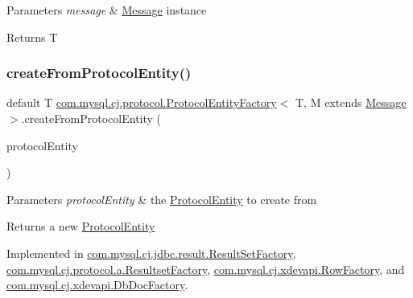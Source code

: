 \begin{DoxyParams}{Parameters}
{\em message} & \mbox{\hyperlink{interfacecom_1_1mysql_1_1cj_1_1protocol_1_1_message}{Message}} instance \\
\hline
\end{DoxyParams}
\begin{DoxyReturn}{Returns}
T 
\end{DoxyReturn}
\mbox{\label{interfacecom_1_1mysql_1_1cj_1_1protocol_1_1_protocol_entity_factory_a282b14fecc86c7202cd9361333235ef8}} 
\subsubsection{\texorpdfstring{create\+From\+Protocol\+Entity()}{createFromProtocolEntity()}}
{\footnotesize\ttfamily default T \mbox{\hyperlink{interfacecom_1_1mysql_1_1cj_1_1protocol_1_1_protocol_entity_factory}{com.\+mysql.\+cj.\+protocol.\+Protocol\+Entity\+Factory}}$<$ T, M extends \mbox{\hyperlink{interfacecom_1_1mysql_1_1cj_1_1protocol_1_1_message}{Message}} $>$.create\+From\+Protocol\+Entity (\begin{DoxyParamCaption}\item[{\mbox{\hyperlink{interfacecom_1_1mysql_1_1cj_1_1protocol_1_1_protocol_entity}{Protocol\+Entity}}}]{protocol\+Entity }\end{DoxyParamCaption})}


\begin{DoxyParams}{Parameters}
{\em protocol\+Entity} & the \mbox{\hyperlink{interfacecom_1_1mysql_1_1cj_1_1protocol_1_1_protocol_entity}{Protocol\+Entity}} to create from \\
\hline
\end{DoxyParams}
\begin{DoxyReturn}{Returns}
a new \mbox{\hyperlink{interfacecom_1_1mysql_1_1cj_1_1protocol_1_1_protocol_entity}{Protocol\+Entity}} 
\end{DoxyReturn}


Implemented in \mbox{\hyperlink{classcom_1_1mysql_1_1cj_1_1jdbc_1_1result_1_1_result_set_factory_a5638ebeb2a785cacf994cadafbfbaac7}{com.\+mysql.\+cj.\+jdbc.\+result.\+Result\+Set\+Factory}}, \mbox{\hyperlink{classcom_1_1mysql_1_1cj_1_1protocol_1_1a_1_1_resultset_factory_a3ee901bd2ae369a6c99f8c38c280c407}{com.\+mysql.\+cj.\+protocol.\+a.\+Resultset\+Factory}}, \mbox{\hyperlink{classcom_1_1mysql_1_1cj_1_1xdevapi_1_1_row_factory_a4320a0bcea400bcd2324daf031ee752f}{com.\+mysql.\+cj.\+xdevapi.\+Row\+Factory}}, and \mbox{\hyperlink{classcom_1_1mysql_1_1cj_1_1xdevapi_1_1_db_doc_factory_ae8ecf27e89019d6b8949a7821ce1c8fe}{com.\+mysql.\+cj.\+xdevapi.\+Db\+Doc\+Factory}}.

